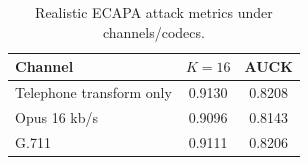 \begin{table}[t]
  \centering
  \caption{Realistic ECAPA attack metrics under channels/codecs.}
  \label{tab:channel-robustness}
  \small
  \setlength{\tabcolsep}{5pt}
  \begin{tabular}{lcc}
    \toprule
    Channel & $K{=}16$ & AUCK \\
    \midrule
    Telephone transform only & 0.9130 & 0.8208 \\
    Opus 16 kb/s & 0.9096 & 0.8143 \\
    G.711 & 0.9111 & 0.8206 \\
    \bottomrule
  \end{tabular}
\end{table}
